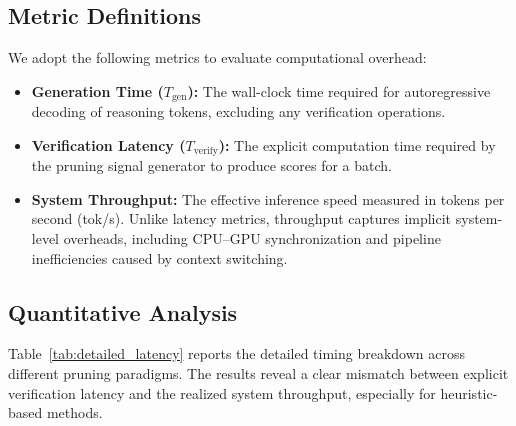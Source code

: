 \documentclass[11pt]{article}
\theoremstyle{plain}
\begin{document}
\subsection{Metric Definitions}
We adopt the following metrics to evaluate computational overhead:
\begin{itemize}[leftmargin=*, noitemsep, topsep=0pt]
    \item \textbf{Generation Time ($T_{\text{gen}}$):} The wall-clock time required for autoregressive decoding of reasoning tokens, excluding any verification operations.
    \item \textbf{Verification Latency ($T_{\text{verify}}$):} The explicit computation time required by the pruning signal generator to produce scores for a batch.
    \item \textbf{System Throughput:} The effective inference speed measured in tokens per second (tok/s). Unlike latency metrics, throughput captures implicit system-level overheads, including CPU--GPU synchronization and pipeline inefficiencies caused by context switching.
\end{itemize}

\subsection{Quantitative Analysis}
Table~\ref{tab:detailed_latency} reports the detailed timing breakdown across different pruning paradigms.
The results reveal a clear mismatch between explicit verification latency and the realized system throughput, especially for heuristic-based methods.
\end{document}
